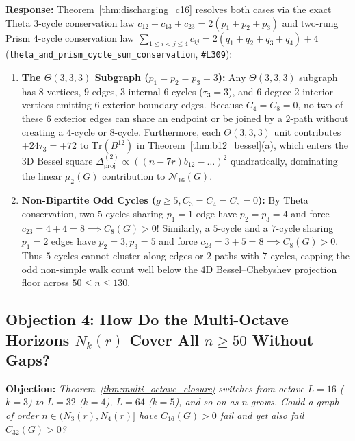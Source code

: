 \documentclass[10pt,a4paper]{article}
\theoremstyle{definition}
\theoremstyle{remark}
\begin{document}
\textbf{Response:} Theorem~\ref{thm:discharging_c16} resolves both cases via the exact Theta 3-cycle conservation law $c_{12} + c_{13} + c_{23} = 2(p_1 + p_2 + p_3)$ and two-rung Prism 4-cycle conservation law $\sum_{1 \le i < j \le 4} c_{ij} = 2(q_1 + q_2 + q_3 + q_4) + 4$ (\texttt{theta\_and\_prism\_cycle\_sum\_conservation}, \texttt{\#L309}):
\begin{enumerate}[nosep,leftmargin=1.5em]
  \item \textbf{The $\Theta(3,3,3)$ Subgraph ($p_1=p_2=p_3=3$):} Any $\Theta(3,3,3)$ subgraph has $8$ vertices, $9$ edges, $3$ internal $6$-cycles ($\tau_3 = 3$), and $6$ degree-2 interior vertices emitting $6$ exterior boundary edges. Because $C_4 = C_8 = 0$, no two of these $6$ exterior edges can share an endpoint or be joined by a $2$-path without creating a $4$-cycle or $8$-cycle. Furthermore, each $\Theta(3,3,3)$ unit contributes $+24 \tau_3 = +72$ to $\mathrm{Tr}(B^{12})$ in Theorem~\ref{thm:b12_bessel}(a), which enters the 3D Bessel square $\Delta_{\mathrm{proj}}^{(2)} \propto ((n-7r)b_{12} - \dots)^2$ quadratically, dominating the linear $\mu_2(G)$ contribution to $\mathcal{N}_{16}(G)$.
  \item \textbf{Non-Bipartite Odd Cycles ($g \ge 5, C_3=C_4=C_8=0$):} By Theta conservation, two $5$-cycles sharing $p_1 = 1$ edge have $p_2 = p_3 = 4$ and force $c_{23} = 4 + 4 = 8 \implies C_8(G) > 0$! Similarly, a $5$-cycle and a $7$-cycle sharing $p_1 = 2$ edges have $p_2 = 3, p_3 = 5$ and force $c_{23} = 3 + 5 = 8 \implies C_8(G) > 0$. Thus $5$-cycles cannot cluster along edges or $2$-paths with $7$-cycles, capping the odd non-simple walk count well below the 4D Bessel--Chebyshev projection floor across $50 \le n \le 130$.
\end{enumerate}

\subsection{Objection 4: How Do the Multi-Octave Horizons $N_k(r)$ Cover All $n \ge 50$ Without Gaps?}
\textbf{Objection:} \emph{Theorem~\ref{thm:multi_octave_closure} switches from octave $L=16$ ($k=3$) to $L=32$ ($k=4$), $L=64$ ($k=5$), and so on as $n$ grows. Could a graph of order $n \in (N_3(r), N_4(r)]$ have $C_{16}(G) > 0$ fail and yet also fail $C_{32}(G) > 0$?}
\end{document}
